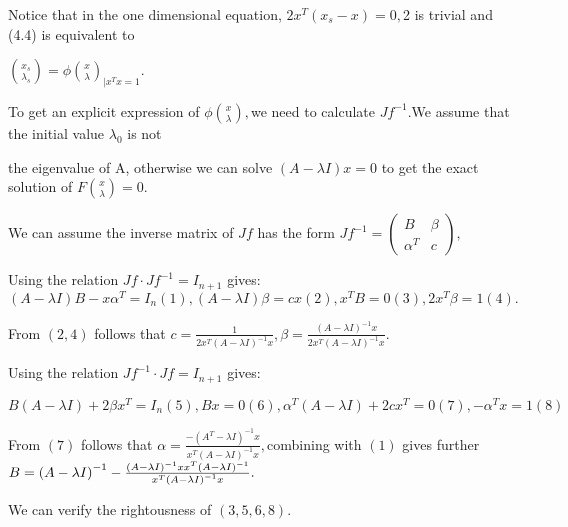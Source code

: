 \documentclass{article}
\begin{document}

Notice that in the one dimensional equation, $2x^{T}\left( x_{s}-x\right) =0,
$2 is trivial and (4.4) is equivalent to

$\binom{x_{s}}{\lambda _{s}}=\phi \binom{x}{\lambda }_{|x^{T}x=1}.$

To get an explicit expression of $\phi \binom{x}{\lambda },$we need to
calculate $Jf^{-1}.$We assume that the initial value $\lambda _{0}$ is not 

the eigenvalue of A, otherwise we can solve $\left( A-\lambda I\right) x=0$
to get the exact solution of  $F\binom{x}{\lambda }=0.$

We can assume the inverse matrix of $Jf$ has the form $Jf^{-1}=\left( 
\begin{array}{cc}
B & \beta  \\ 
\alpha ^{T} & c%
\end{array}%
\right) ,$

\bigskip Using the relation  $Jf\cdot Jf^{-1}=I_{n+1}$ gives: $\left(
A-\lambda I\right) B-x\alpha ^{T}=I_{n}\left( 1\right) ,\left( A-\lambda
I\right) \beta =cx\left( 2\right) ,x^{T}B=0\left( 3\right) ,2x^{T}\beta
=1\left( 4\right) .$

From $\left( 2,4\right) $ follows that $c=\frac{1}{2x^{T}\left( A-\lambda
I\right) ^{-1}x},\beta =\frac{\left( A-\lambda I\right) ^{-1}x}{2x^{T}\left(
A-\lambda I\right) ^{-1}x}.$

Using the relation $Jf^{-1}\cdot Jf=I_{n+1}$ gives: 

$B\left( A-\lambda I\right) +2\beta x^{T}=I_{n}\left( 5\right) ,Bx=0\left(
6\right) ,\alpha ^{T}\left( A-\lambda I\right) +2cx^{T}=0\left( 7\right)
,-\alpha ^{T}x=1\left( 8\right) $

From $\left( 7\right) $ follows that $\alpha =\frac{-\left( A^{T}-\lambda
I\right) ^{-1}x}{x^{T}\left( A-\lambda I\right) ^{-1}x},$combining with $%
\left( 1\right) $ gives further $B=\left( A-\lambda I\right) ^{-1}-\frac{%
\left( A-\lambda I\right) ^{-1}xx^{T}\left( A-\lambda I\right) ^{-1}}{%
x^{T}\left( A-\lambda I\right) ^{-1}x}.$

We can verify the rightousness of $\left( 3,5,6,8\right) .$
\end{document}
